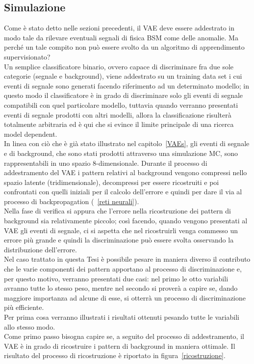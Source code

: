 \subsection{Simulazione}
\label{simulazione}
Come è stato detto nelle sezioni precedenti, il VAE deve essere addestrato in modo tale da rilevare eventuali segnali di fisica BSM come delle anomalie. Ma perché un tale compito non può essere svolto da un algoritmo di apprendimento supervisionato?\\
Un semplice classificatore binario, ovvero capace di discriminare fra due sole categorie (segnale e background), viene addestrato su un training data set i cui eventi di segnale sono generati facendo riferimento ad un determinato modello; in questo modo il classificatore è in grado di discriminare solo gli eventi di segnale compatibili con quel particolare modello, tuttavia quando verranno presentati eventi di segnale prodotti con altri modelli, allora la classificazione risulterà totalmente arbitraria ed è qui che si evince il limite principale di una ricerca model dependent. \\
In linea con ciò che è già stato illustrato nel capitolo~\ref{VAEs}, gli eventi di segnale e di background, che sono stati prodotti attraverso una simulazione MC, sono rappresentabili in uno spazio 8-dimensionale. Durante il processo di addestramento del VAE i pattern relativi al background vengono compressi nello spazio latente (tridimensionale), decompressi per essere ricostruiti e poi confrontati con quelli iniziali per il calcolo dell'errore e quindi per dare il via al processo di backpropagation (~\ref{reti neurali}). \\
Nella fase di verifica si appura che l'errore nella ricostruzione dei pattern di background sia relativamente piccolo; così facendo, quando vengono presentati al VAE gli eventi di segnale, ci si aspetta che nel ricostruirli venga commesso un errore più grande e quindi la discriminazione può essere svolta osservando la distribuzione dell'errore. \\
Nel caso trattato in questa Tesi è possibile pesare in maniera diverso il contributo che le varie componenti dei pattern apportano al processo di discriminazione e, per questo motivo, verranno presentati due casi: nel primo le otto variabili avranno tutte lo stesso peso, mentre nel secondo si proverà a capire se, dando maggiore importanza ad alcune di esse, si otterrà un processo di discriminazione più efficiente. \\ 
Per prima cosa verranno illustrati i risultati ottenuti pesando tutte le variabili allo stesso modo. \\
Come primo passo bisogna capire se, a seguito del processo di addestramento, il VAE è in grado di ricostruire i pattern di background in maniera ottimale. Il risultato del processo di ricostruzione è riportato in figura~\ref{ricostruzione}. 


